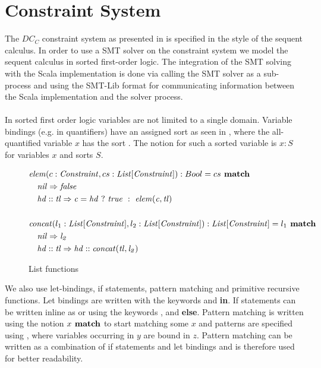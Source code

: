 \section{Constraint System}
The $DC_C$ constraint system as presented in 
is specified in the style of the sequent calculus.
In order to use a SMT solver on the constraint system
we model the sequent calculus in sorted first-order logic.
The integration of the SMT solving with the Scala implementation
is done via calling the SMT solver as a sub-process and using
the SMT-Lib format for communicating information between
the Scala implementation and the solver process.
\\ \\
In sorted first order logic variables are not limited to a single domain.
Variable bindings (e.g. in quantifiers)
have an assigned sort as seen in ,
where the all-quantified variable $x$ has the sort .
The notion for such a sorted variable is $x: S$
for variables $x$ and sorts $S$.
\begin{figure}[b]
\begin{align*}
&\mathit{elem}(c: \mathit{Constraint}, cs: \mathit{List[\mathit{Constraint}]}): Bool = cs \textbf{ match}\\
&\quad \mathit{\mathit{nil}} \Rightarrow \mathit{false}\\
&\quad \mathit{hd :: tl} \Rightarrow \mathit{c = hd\ ?\ true\ :\ \mathit{elem}(c, tl)}\\\\
&\mathit{concat}(l_1: \mathit{List[\mathit{Constraint}]}, l_2: \mathit{List[\mathit{Constraint}]}): \mathit{List[\mathit{Constraint}]} = l_1 \textbf{ match}\\
&\quad \mathit{\mathit{nil}} \Rightarrow \mathit{l_2}\\
&\quad \mathit{hd :: tl} \Rightarrow \mathit{hd :: \mathit{concat}(tl, l_2)}
\end{align*}
\caption{List functions}
\label{fig:fo-list-funs}
\end{figure}
%
We also use let-bindings, if statements, pattern matching and primitive recursive functions.
Let bindings are written with the keywords \Let and \textbf{in}.
If statements can be written inline as  or using
the keywords \If, \Then and \textbf{else}.
Pattern matching is written using the notion $x \textbf{ match}$ to start matching some $x$
and patterns are specified using ,
where variables occurring in $y$ are bound in $z$.
Pattern matching can be written as a combination of if statements and let bindings
and is therefore used for better readability.

